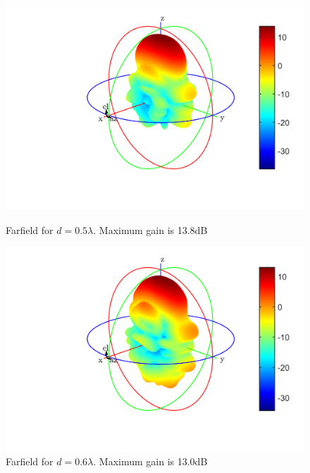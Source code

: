 \begin{figure}[H]
  \centering
  \begin{minipage}[b]{0.5\textwidth}
	\includegraphics[scale = 0.5]{figures/measurement/antennas/array_4_0p5.png}
	\caption{Farfield for $d = 0.5\lambda$. Maximum gain is 13.8dB}
    \label{fig:chamber_four_ant_ff_05}
  \end{minipage}
  \hfill
  \begin{minipage}[b]{0.4\textwidth}
\includegraphics[scale = 0.5]{figures/measurement/antennas/array_4_0p6.png}
\caption{Farfield for $d = 0.6\lambda$. Maximum gain is 13.0dB}
    \label{fig:chamber_four_ant_ff:06}
  \end{minipage}
\end{figure}



